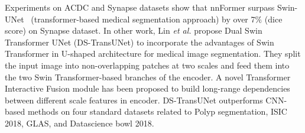 \documentclass[10pt,journal,compsoc]{IEEEtran}
\begin{document}
Experiments on ACDC and Synapse datasets show that
nnFormer surpass Swin-UNet~\cite{cao2021swin} (transformer-based medical segmentation approach) by over 7$\%$ (dice score) on Synapse dataset.
In other work, Lin \textit{et al.} propose  Dual Swin Transformer UNet (DS-TransUNet) \cite{lin2021ds} to incorporate the advantages of Swin Transformer in U-shaped architecture for medical image segmentation. They split the input image into non-overlapping patches at two scales and feed them into the two Swin Transformer-based branches of the encoder. A novel Transformer Interactive Fusion module has been proposed to build long-range dependencies between different scale features in encoder. DS-TransUNet outperforms CNN-based methods on four standard datasets related to Polyp segmentation, ISIC 2018, GLAS, and Datascience bowl 2018. %
\end{document}
